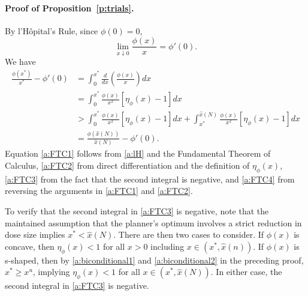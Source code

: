 \documentclass[12pt]{article}
\newcommand{\efficacy}{\phi}
\newcommand{\xh}{\hat{x}}
\newcommand{\elasticity}[1]{\eta_{#1}}
\begin{document}

\paragraph{Proof of Proposition~\ref{p:trials}.}

By l'H\^{o}pital's Rule, since $\efficacy(0) = 0$, 
\begin{equation}
\label{a:lH}
\lim_{x \downarrow 0} \frac{\efficacy(x)}{x} = \efficacy'(0).
\end{equation}
We have 
\begin{align}
\frac{\efficacy(x^*)}{x^*} - \efficacy'(0) & = \int_0^{x^*} \frac{d}{dx} \left( \frac{\efficacy(x)}{x} \right) dx \label{a:FTC1} \\
& = \int_0^{x^*} \frac{\efficacy(x)}{x^2} \left[ \elasticity{\efficacy}(x) - 1 \right] dx \label{a:FTC2} \\ 
& >  \int_0^{x^*} \frac{\efficacy(x)}{x^2} \left[ \elasticity{\efficacy}(x) - 1 \right] dx + \int_{x^*}^{\xh(N)} \frac{\efficacy(x)}{x^2} \left[ \elasticity{\efficacy}(x) - 1 \right] dx \label{a:FTC3} \\ 
& = \frac{\efficacy(\xh(N))}{\xh(N)} - \efficacy'(0). \label{a:FTC4} 
\end{align}
Equation \eqref{a:FTC1} follows from \eqref{a:lH} and the Fundamental Theorem of Calculus, \eqref{a:FTC2} from direct differentiation and the definition of $\elasticity{\efficacy}(x)$, \eqref{a:FTC3} from the fact that the second integral is negative, and \eqref{a:FTC4} from reversing the arguments in \eqref{a:FTC1} and \eqref{a:FTC2}.

To verify that the second integral in \eqref{a:FTC3} is negative, note that the maintained assumption that the planner's optimum involves a strict reduction in dose size implies $x^* < \xh(N)$. There are then two cases to consider. If $\efficacy(x)$ is concave, then $\elasticity{\efficacy}(x) < 1$ for all $x > 0$ including $x \in (x^*, \xh(n))$. If $\efficacy(x)$ is s-shaped, then by \eqref{a:biconditional1} and \eqref{a:biconditional2} in the preceding proof, $x^* \geq x^u$, implying $\elasticity{\efficacy}(x) < 1$ for all  $x \in (x^*, \xh(N))$. In either case, the second integral in \eqref{a:FTC3} is negative.  
 
\end{document}
